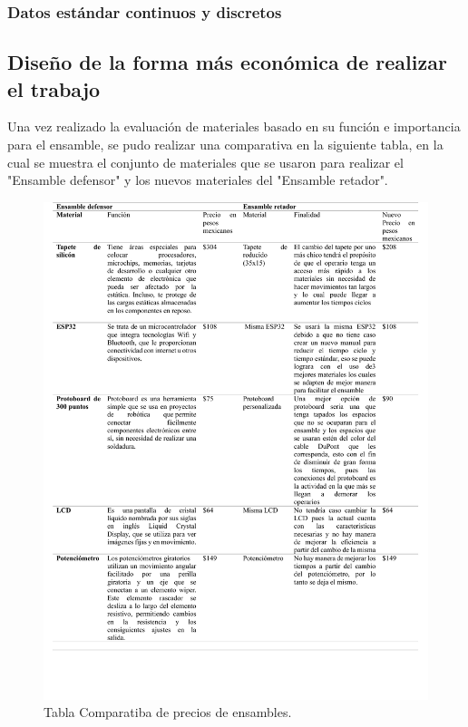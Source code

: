     \subsubsection{Datos estándar continuos y discretos}
    \subsection{Diseño de la forma más económica de realizar el trabajo}
    
    Una vez realizado la evaluación de materiales basado en su función e importancia para el ensamble, se pudo realizar una comparativa en la siguiente tabla, en la cual se muestra el conjunto de materiales que se usaron para realizar el "Ensamble defensor" y los nuevos materiales del "Ensamble retador".
    
    \begin{figure}[H]
        \centering
        \includegraphics[scale=0.181]{21/img/comparacionPrecios.pdf}
        \caption{Tabla Comparatiba de precios de ensambles.}
        \label{fig:comparacionPrecios}
    \end{figure}
    
